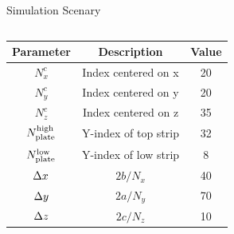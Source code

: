 \documentclass{beamer}
\begin{document}
\begin{frame}{Simulation Scenary}
\begin{columns}
        \begin{column}{0.35\textwidth}
          \begin{table}[H]
          \resizebox{\textwidth}{!}
          {
            \begin{tabular}{|c|c|c|}
            \hline
            \textbf{Parameter}                           & \textbf{Description} & \textbf{Value} \\ \hline
            $N_x^c$                                      & Index centered on x  & 20             \\ \hline
            $N_y^c$                                      & Index centered on y  & 20             \\ \hline
            $N_z^c$                                      & Index centered on z  & 35             \\ \hline
            $N_{\textnormal{plate}}^{\textnormal{high}}$ & Y-index of top strip & 32             \\ \hline
            $N_{\textnormal{plate}}^{\textnormal{low}}$  & Y-index of low strip & 8              \\ \hline
            $\Delta x$                                        & ${2b}/{N_x}$         & 40             \\ \hline
            $\Delta y$                                        & ${2a}/{N_y}$         & 70             \\ \hline
            $\Delta z$                                        & ${2c}/{N_z}$         & 10             \\ \hline
            \end{tabular}
          }
          \end{table}
        \end{column}

      \end{columns}


\end{frame}
\end{document}
